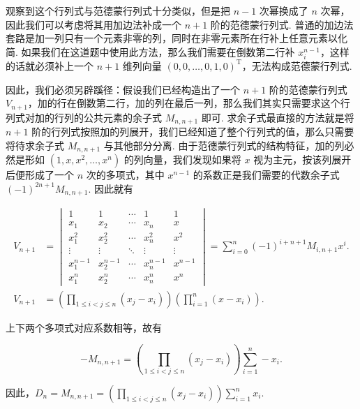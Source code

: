 \documentclass[12pt,fontset=fandol]{ctexart}
\begin{document}
\begin{solve}
观察到这个行列式与范德蒙行列式十分类似，但是把 $n-1$ 次幂换成了 $n$ 次幂，因此我们可以考虑将其用加边法补成一个 $n+1$ 阶的范德蒙行列式. 普通的加边法套路是加一列只有一个元素非零的列，同时在非零元素所在行补上任意元素以化简. 如果我们在这道题中使用此方法，那么我们需要在倒数第二行补 $x_i^{n-1}$，这样的话就必须补上一个 $n+1$ 维列向量 $(0, 0, \ldots, 0, 1, 0)^{\mathrm{T}}$，无法构成范德蒙行列式.

    

    因此，我们必须另辟蹊径：假设我们已经构造出了一个 $n+1$ 阶的范德蒙行列式 $V_{n+1}$，加的行在倒数第二行，加的列在最后一列，那么我们其实只需要求这个行列式对加的行列的公共元素的余子式 $M_{n,n+1}$ 即可. 求余子式最直接的方法就是将 $n+1$ 阶的行列式按照加的列展开，我们已经知道了整个行列式的值，那么只需要将待求余子式 $M_{n,n+1}$ 与其他部分分离. 由于范德蒙行列式的结构特征，加的列必然是形如 $(1, x, x^2, \ldots, x^n)$ 的列向量，我们发现如果将 $x$ 视为主元，按该列展开后便形成了一个 $n$ 次的多项式，其中 $x^{n-1}$ 的系数正是我们需要的代数余子式 $(-1)^{2n+1} M_{n,n+1}$. 因此就有

    \begin{align*}
        V_{n+1} &= \begin{vmatrix}
            1      & 1      & \cdots & 1      & 1      \\
            x_1    & x_2    & \cdots & x_n    & x      \\
            x_1^2  & x_2^2  & \cdots & x_n^2  & x^2    \\
            \vdots & \vdots & \ddots & \vdots & \vdots \\
            x_1^{n-1} & x_2^{n-1} & \cdots & x_n^{n-1} & x^{n-1} \\
            x_1^n  & x_2^n  & \cdots & x_n^n  & x^n
        \end{vmatrix} = \sum\limits_{i=0}^n (-1)^{i+n+1} M_{i, n+1} x^i. \\
        V_{n+1} &= \left( \prod\limits_{1 \leqslant i < j \leqslant n} (x_j - x_i) \right) \left(\prod\limits_{i=1}^n (x - x_i) \right).
    \end{align*}

    上下两个多项式对应系数相等，故有

    \[
        - M_{n,n+1} = \left( \prod\limits_{1 \leqslant i < j \leqslant n} (x_j - x_i) \right) \sum\limits_{i=1}^n -x_i.
    \]

    因此，$D_n = M_{n, n+1} = \left( \displaystyle\prod_{1 \leqslant i < j \leqslant n} (x_j - x_i) \right) \displaystyle\sum_{i=1}^n x_i$.
\end{solve}
\end{document}
